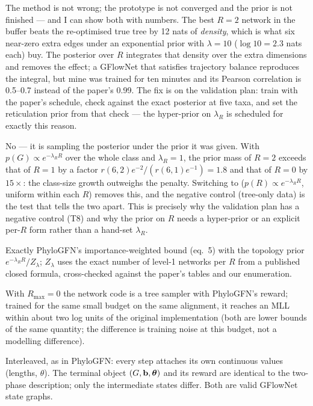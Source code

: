 The method is not wrong; the prototype is not converged and the prior is not finished --- and I can show both with numbers. The best $R=2$ network in the buffer beats the re-optimised true tree by 12 nats of \emph{density}, which is what six near-zero extra edges under an exponential prior with $\lambda=10$ ($\log10=2.3$ nats each) buy. The posterior over $R$ integrates that density over the extra dimensions and removes the effect; a GFlowNet that satisfies trajectory balance reproduces the integral, but mine was trained for ten minutes and its Pearson correlation is 0.5--0.7 instead of the paper's 0.99. The fix is on the validation plan: train with the paper's schedule, check against the exact posterior at five taxa, and set the reticulation prior from that check --- the hyper-prior on $\lambda_R$ is scheduled for exactly this reason.

No --- it is sampling the posterior under the prior it was given. With $p(G)\propto e^{-\lambda_RR}$ over the whole class and $\lambda_R=1$, the prior mass of $R=2$ exceeds that of $R=1$ by a factor $r(6,2)e^{-2}/(r(6,1)e^{-1})=1.8$ and that of $R=0$ by $15\times$: the class-size growth outweighs the penalty. Switching to  ($p(R)\propto e^{-\lambda_RR}$, uniform within each $R$) removes this, and the negative control (tree-only data) is the test that tells the two apart. This is precisely why the validation plan has a negative control (T8) and why the prior on $R$ needs a hyper-prior or an explicit per-$R$ form rather than a hand-set $\lambda_R$.

Exactly PhyloGFN's importance-weighted bound (eq.~5) with the topology prior $e^{-\lambda_RR}/Z_\lambda$; $Z_\lambda$ uses the exact number of level-1 networks per $R$ from a published closed formula, cross-checked against the paper's tables and our enumeration.

With $R_{\max}=0$ the network code is a tree sampler with PhyloGFN's reward; trained for the same small budget on the same alignment, it reaches an MLL within about two log units of the original implementation (both are lower bounds of the same quantity; the difference is training noise at this budget, not a modelling difference).

Interleaved, as in PhyloGFN: every step attaches its own continuous values (lengths, $\theta$). The terminal object $(G,\mathbf{b},\bm{\theta})$ and its reward are identical to the two-phase description; only the intermediate states differ. Both are valid GFlowNet state graphs.

